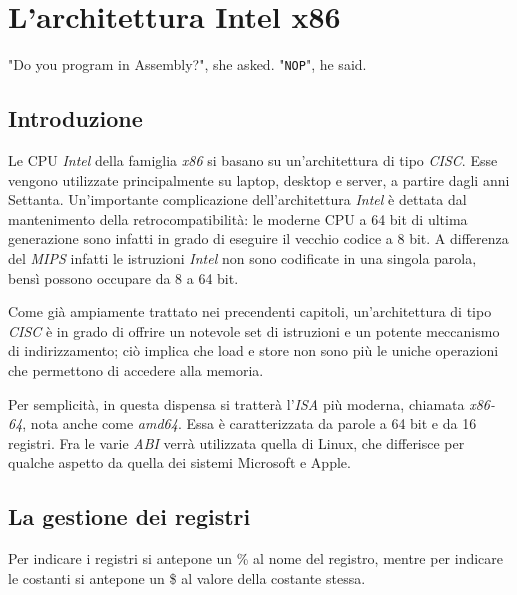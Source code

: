 



\chapter{L'architettura Intel x86}\begin{fquote}[Anonymous]"Do you program in Assembly?", she asked. "\texttt{NOP}", he said.
 \end{fquote}

\section{Introduzione}
Le CPU \emph{Intel} della famiglia \emph{x86} si basano su un'architettura di tipo \emph{CISC}. Esse vengono utilizzate principalmente su laptop, desktop e server, a partire dagli anni Settanta. Un'importante complicazione dell'architettura \emph{Intel} è dettata dal mantenimento della retrocompatibilità: le moderne CPU a 64 bit di ultima generazione sono infatti in grado di eseguire il vecchio codice a 8 bit. A differenza del \emph{MIPS} infatti le istruzioni \emph{Intel} non sono codificate in una singola parola, bensì possono occupare da 8 a 64 bit.

Come già ampiamente trattato nei precendenti capitoli, un'architettura di tipo \emph{CISC} è in grado di offrire un notevole set di istruzioni e un potente meccanismo di indirizzamento; ciò implica che load e store non sono più le uniche operazioni che permettono di accedere alla memoria.

Per semplicità, in questa dispensa si tratterà l'\emph{ISA} più moderna, chiamata \emph{x86-64}, nota anche come \emph{amd64}. Essa è caratterizzata da parole a 64 bit e da 16 registri. Fra le varie \emph{ABI} verrà utilizzata quella di Linux, che differisce per qualche aspetto da quella dei sistemi Microsoft e Apple.

\section{La gestione dei registri}
Per indicare i registri si antepone un \% al nome del registro, mentre per indicare le costanti si antepone un \$ al valore della costante stessa.

